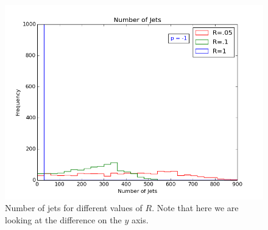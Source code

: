 \begin{figure}[hbtp]
 \centering
 \includegraphics[scale=.8]{images/n_of_jets_obs.png}
 \caption{Number of jets for different values of $R$. Note that here we are looking at the difference on the $y$ axis. 
 }\label{nofjet}
 \end{figure}
  
